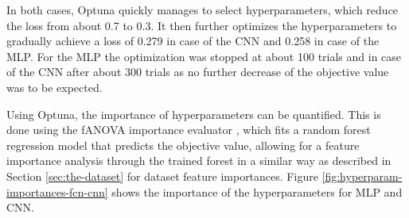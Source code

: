 \documentclass[runningheads]{llncs}
\begin{document}
In both cases, Optuna quickly manages to select hyperparameters, which reduce the loss from about 0.7 to 0.3. It then further optimizes the hyperparameters to gradually achieve a loss of 0.279 in case of the CNN and 0.258 in case of the MLP. For the MLP the optimization was stopped at about 100 trials and in case of the CNN after about 300 trials as no further decrease of the objective value was to be expected.

Using Optuna, the importance of hyperparameters can be quantified. This is done using the fANOVA importance evaluator \cite{pmlr-v32-hutter14}, which fits a random forest regression model that predicts the objective value, allowing for a feature importance analysis through the trained forest in a similar way as described in Section \ref{sec:the-dataset} for dataset feature importances.
Figure \ref{fig:hyperparam-importances-fcn-cnn} shows the importance of the hyperparameters for MLP and CNN.
\end{document}
